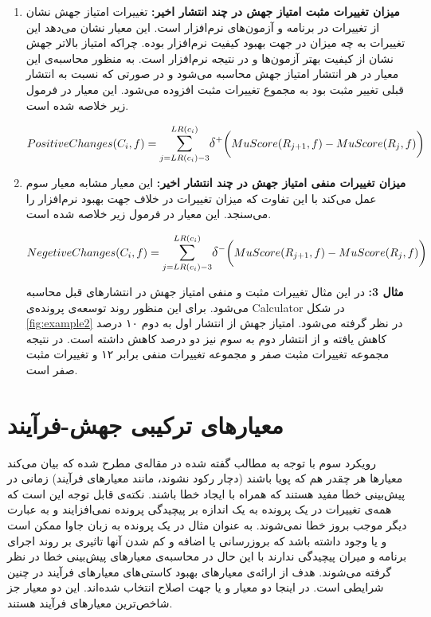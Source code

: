 \begin{enumerate}
	\item 
	\textbf{
		میزان تغییرات مثبت امتیاز جهش  در چند انتشار اخیر:}
	تغییرات امتیاز جهش نشان از تغییرات در برنامه و آزمون‌های نرم‌افزار است. این معیار نشان می‌دهد این تغییرات به چه میزان در جهت بهبود کیفیت نرم‌افزار بوده. چراکه امتیاز بالاتر جهش نشان از کیفیت بهتر آزمون‌ها و در نتیجه نرم‌افزار است.  به منظور محاسبه‌ی این معیار در هر انتشار امتیاز جهش محاسبه می‌شود و در صورتی که نسبت به انتشار قبلی تغییر مثبت  بود به مجموع تغییرات  مثبت  افزوده می‌شود. این معیار در فرمول زیر خلاصه شده است.
\begin{latin}
\[
PositiveChanges(C_i,f) = \mathlarger{\sum}\limits_{j=LR(c_i)-3}^{LR(c_i)} 
\mathlarger{\delta}^+\bigg(MuScore(R_{j+1},f) - MuScore(R_j,f)\bigg) 
\]
\end{latin}	


	\item 
	\textbf{
		میزان تغییرات منفی امتیاز جهش در چند انتشار اخیر:}
	این معیار مشابه معیار سوم عمل می‌کند با این تفاوت که میزان تغییرات در خلاف جهت بهبود نرم‌افزار را می‌سنجد. این معیار در فرمول زیر خلاصه شده است.
\begin{latin}
	\[
	NegetiveChanges(C_i,f) = \mathlarger{\sum}\limits_{j=LR(c_i)-3}^{LR(c_i)} 
	\mathlarger{\delta}^-\bigg(MuScore(R_{j+1},f) - MuScore(R_j,f)\bigg) 
	\]
\end{latin}	
\textbf{مثال 3:}
در این مثال تغییرات مثبت و منفی امتیاز جهش در انتشارهای قبل محاسبه می‌شود. برای این منظور روند توسعه‌ی پرونده‌ی Calculator در شکل \ref{fig:example2}  در نظر گرفته می‌شود. امتیاز جهش از انتشار اول به دوم ۱۰ درصد کاهش یافته و از انتشار دوم به سوم نیز دو درصد کاهش داشته است. در نتیجه مجموعه تغییرات مثبت صفر و مجموعه تغییرات منفی برابر ۱۲ و تغییرات مثبت صفر است. 
	
\end{enumerate}


\section{معیارهای ترکیبی جهش-فرآیند}

رویکرد سوم با توجه به مطالب گفته شده در مقاله‌ی \cite{rahman2013and} مطرح شده که بیان می‌کند معیارها هر چقدر هم که پویا باشند (دچار رکود نشوند، مانند معیارهای فرآیند) زمانی در پیش‌بینی خطا مفید هستند که همراه با ایجاد خطا باشند. نکته‌ی قابل توجه این است که همه‌ی تغییرات در یک پرونده به یک اندازه  بر پیچیدگی پرونده نمی‌افزایند و به عبارت دیگر موجب بروز خطا نمی‌شوند. به عنوان مثال در یک پرونده به زبان جاوا ممکن است  و یا  وجود داشته باشد که بروزرسانی یا اضافه و کم شدن آنها تاثیری بر روند اجرای برنامه و میران پیچیدگی ندارند با این حال در محاسبه‌ی معیارهای پیش‌بینی خطا در نظر گرفته می‌شوند. هدف از ارائه‌ی معیارهای  بهبود کاستی‌های معیارهای فرآیند در چنین شرایطی است. در اینجا دو معیار  و یا   جهت اصلاح انتخاب شده‌اند.  این دو معیار جز شاخص‌ترین معیارهای فرآیند هستند.\\

